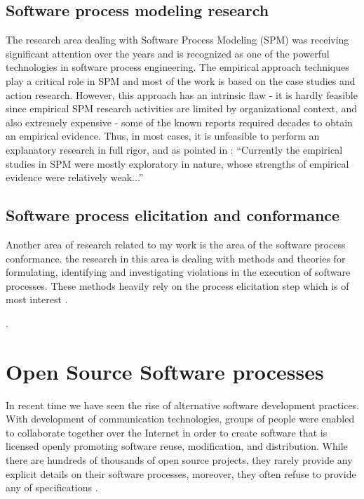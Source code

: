 \subsection{Software process modeling research}
The research area dealing with Software Process Modeling (SPM) was receiving significant 
attention over the years and is recognized as one of the powerful technologies
in software process engineering. The empirical approach techniques play a critical role
in SPM and most of the work is based on the case studies and action research. 
However, this approach has an intrinsic flaw - it is hardly feasible since
empirical SPM research activities are limited by organizational context, and also extremely 
expensive - some of the known reports required decades to obtain an empirical evidence.
Thus, in most cases, it is unfeasible to perform an explanatory research in full rigor,
and as pointed in \cite{citeulike:11079867}: ``Currently the empirical studies in SPM were 
mostly exploratory in nature, whose strengths of empirical evidence were relatively weak...''

\subsection{Software process elicitation and conformance}
Another area of research related to my work is the area of the software process conformance. 
the research in this area is dealing with methods and theories for formulating, identifying and
investigating violations in the execution of software processes. These methods heavily rely
on the process elicitation step which is of most interest . 

.

\section{Open Source Software processes}\label{oss.processes}
In recent time we have seen the rise of alternative software development practices. 
With development of communication technologies, groups of people were 
enabled to collaborate together over the Internet in order to create software that is 
licensed openly promoting software reuse, modification, and distribution. While there are 
hundreds of thousands of open source projects, they rarely provide any explicit details on 
their software processes, moreover, they often refuse to provide any of 
specifications \cite{Torvalds:2005}. 

